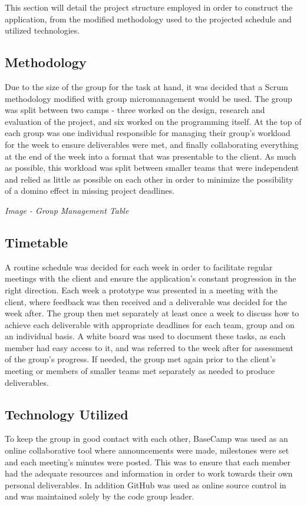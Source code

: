 This section will detail the project structure employed in order to construct the application, from the modified methodology used to the projected schedule and utilized technologies.

\subsection{Methodology}
Due to the size of the group for the task at hand, it was decided that a Scrum methodology modified with group micromanagement would be used. The group was split between two camps - three worked on the design, research and evaluation of the project, and six worked on the programming itself. At the top of each group was one individual responsible for managing their group's workload for the week to ensure deliverables were met, and finally collaborating everything at the end of the week into a format that was presentable to the client. As much as possible, this workload was split between smaller teams that were independent and relied as little as possible on each other in order to minimize the possibility of a domino effect in missing project deadlines.

\begin{center}
\textit{Image - Group Management Table}
\end{center}

\subsection{Timetable}
A routine schedule was decided for each week in order to facilitate regular meetings with the client and ensure the application's constant progression in the right direction. Each week a prototype was presented in a meeting with the client, where feedback was then received and a deliverable was decided for the week after. The group then met separately at least once a week to discuss how to achieve each deliverable with appropriate deadlines for each team, group and on an individual basis. A white board was used to document these tasks, as each member had easy access to it, and was referred to the week after for assessment of the group's progress. If needed, the group met again prior to the client's meeting or members of smaller teams met separately as needed to produce deliverables.

\subsection{Technology Utilized}
To keep the group in good contact with each other, BaseCamp was used as an online collaborative tool where announcements were made, milestones were set and each meeting's minutes were posted. This was to ensure that each member had the adequate resources and information in order to work towards their own personal deliverables. In addition GitHub was used as online source control in and was maintained solely by the code group leader.

